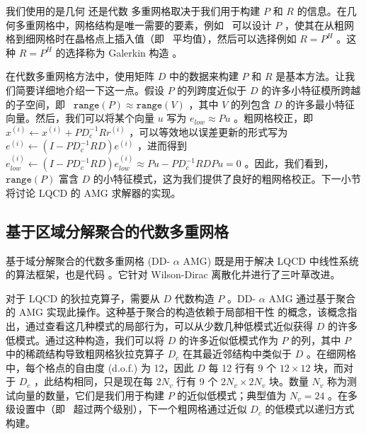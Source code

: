 \documentclass[5p,times,a4paper,fleqn]{cas-dc}
\begin{document}
我们使用的是几何    \cite{briggs2000multigrid,wesseling2001geometric}    还是代数    \cite{stuben2001introduction,falgout2006introduction}    多重网格取决于我们用于构建    $P$    和    $R$    的信息。在几何多重网格中，网格结构是唯一需要的要素，例如 \  可以设计    $P$    ，使其在从粗网格到细网格时在晶格点上插入值（即 \  平均值），然后可以选择例如    $R = P^{H}$    。这种    $R = P^{H}$    的选择称为 Galerkin 构造    \cite{briggs2000multigrid}    。  

在代数多重网格方法中，使用矩阵    $D$    中的数据来构建    $P$    和    $R$    是基本方法。让我们简要详细地介绍一下这一点。假设    $P$    的列跨度近似于    $D$    的许多小特征模所跨越的子空间，即 \     $\texttt{range}(P) \approx \texttt{range}(V)$    ，其中    $V$    的列包含    $D$    的许多最小特征向量。然后，我们可以将某个向量    $u$    写为    $e_{low} \approx Pu$    。粗网格校正，即 \     $x^{(i)} \leftarrow x^{(i)} + P D_{c}^{-1} R r^{(i)}$    ，可以等效地以误差更新的形式写为    $e^{(i)} \leftarrow (I - P D_{c}^{-1} R D) e^{(i)}$    ，进而得到    $e_{low}^{(i)} \leftarrow (I - P D_{c}^{-1} R D) e_{low}^{(i)} \approx Pu - P D_{c}^{-1} R D Pu = 0$    。因此，我们看到，   $\texttt{range}(P)$    富含    $D$    的小特征模式，这为我们提供了良好的粗网格校正。下一小节将讨论 LQCD 的 AMG 求解器的实现。  

   \subsection{基于区域分解聚合的代数多重网格  }       \label{subsect:ddalphaamg}     

基于域分解聚合的代数多重网格 (DD-    $\alpha$    AMG)    \cite{rottmann2016adaptive,Frommer2014}    既是用于解决 LQCD 中线性系统的算法框架，也是代码    \cite{wuppertalDDalphaAMG}   。它针对 Wilson-Dirac 离散化并进行了三叶草改进。  

对于 LQCD 的狄拉克算子，需要从    $D$    代数构造    $P$   。DD-    $\alpha$    AMG 通过基于聚合的 AMG 实现此操作。这种基于聚合的构造依赖于局部相干性    \cite{luscher2007local}    的概念，该概念指出，通过查看这几种模式的局部行为，可以从少数几种低模式近似获得    $D$    的许多低模式。通过这种构造，我们可以将    $D$    的许多近似低模式作为    $P$    的列，其中    $P$    中的稀疏结构导致粗网格狄拉克算子    $D_{c}$    在其最近邻结构中类似于    $D$   。在细网格中，每个格点的自由度 (d.o.f.) 为 12，因此    $D$    每 12 行有 9 个    $12 \times 12$    块，而对于    $D_{c}$   ，此结构相同，只是现在每    $2N_{v}$    行有 9 个    $2N_{v} \times 2N_{v}$    块。数量    $N_{v}$    称为测试向量的数量，它们是我们用于构建    $P$    的近似低模式；典型值为    $N_{v} = 24$    。在多级设置中（即 \  超过两个级别），下一个粗网格通过近似    $D_{c}$    的低模式以递归方式构建。  
\end{document}
